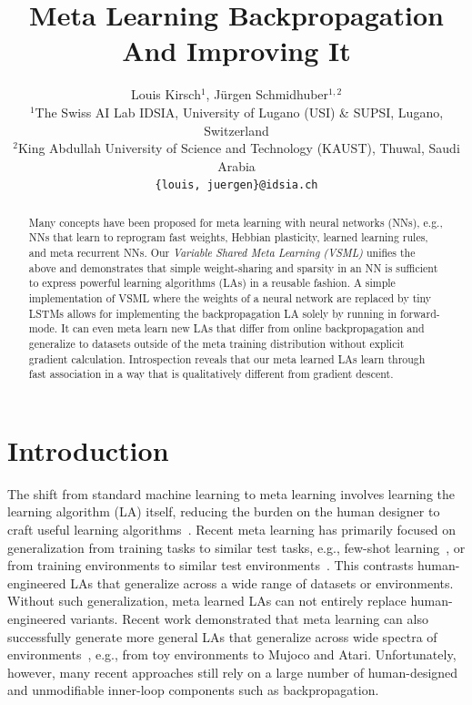\documentclass{article}
\title{Meta Learning Backpropagation And Improving It}
\author{%
  Louis Kirsch$^{1}$,  J\"urgen Schmidhuber$^{1,2}$\\
  $^1$The Swiss AI Lab IDSIA, University of Lugano (USI) \& SUPSI, Lugano, Switzerland \\
  $^2$King Abdullah University of Science and Technology (KAUST), Thuwal, Saudi Arabia \\
  \texttt{\{louis, juergen\}@idsia.ch} \\
}
\begin{document}
\maketitle

\begin{abstract}
Many concepts have been proposed for meta learning with neural networks (NNs), e.g., NNs that learn to reprogram fast weights, Hebbian plasticity, learned learning rules, and meta recurrent NNs.
Our \emph{Variable Shared Meta Learning (VSML)}
unifies the above and demonstrates that simple weight-sharing and sparsity in an NN is sufficient to express powerful learning algorithms (LAs) in a reusable fashion.
A simple implementation of VSML where the weights of a neural network are replaced by tiny LSTMs allows for implementing the backpropagation LA solely by running in forward-mode.
It can even meta learn new LAs that differ from online backpropagation and generalize to datasets outside of the meta training distribution without explicit gradient calculation.
Introspection reveals that our meta learned LAs learn through fast association in a way that is qualitatively different from gradient descent.
\end{abstract}

\section{Introduction}\label{introduction}

The shift from standard machine learning to meta learning involves learning the learning algorithm (LA) itself, reducing the burden on the human designer to craft useful learning algorithms~\citep{Schmidhuber:87}.
Recent meta learning has primarily focused on generalization from training tasks to similar test tasks, e.g., few-shot learning~\citep{Finn2017}, or from training environments to similar test environments~\citep{Houthooft2018}.
This contrasts human-engineered LAs that generalize across a wide range of datasets or environments.
Without such generalization, meta learned LAs can not entirely replace human-engineered variants.
Recent work demonstrated that meta learning can also successfully generate more general LAs that generalize across wide spectra of environments~\citep{kirsch2020improving,alet2020metalearning,Oh2020}, e.g., from toy environments to Mujoco and Atari.
Unfortunately, however, many recent approaches still rely on a large number of human-designed and unmodifiable inner-loop components such as backpropagation.
\end{document}

